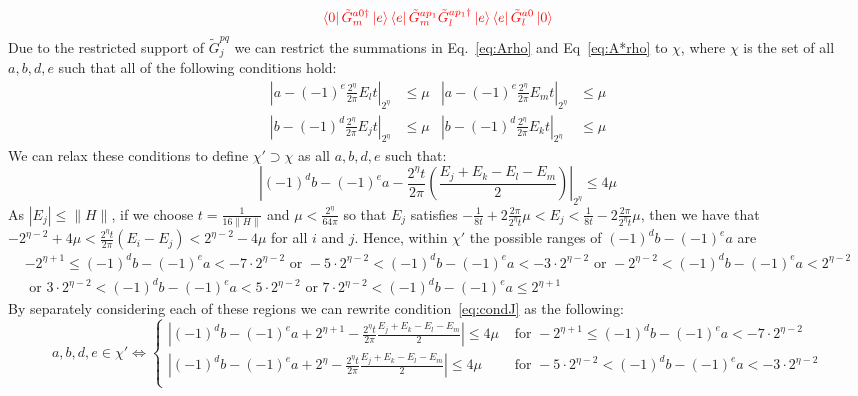 \documentclass[aps,floatfix,10pt,amssymb,amsfont,amsmath,superscriptaddress,float,nofootinbib,longbibliography,nobalancelastpage,twocolumn]{revtex4-2}
\begin{document}
\begin{widetext}
\begin{multline}
    \textcolor{red}{\bra{0}\tilde G_m^{a0\dagger}\ket{e}\bra{e}\tilde G_m^{ap_1}\tilde G_l^{ap_1\dagger}\ket{e}\bra{e}\tilde G_l^{a0}\ket{0}}
        \label{eq:A*rho}  
\end{multline}
Due to the restricted support of $\tilde G^{pq}_j$ we can restrict the summations in Eq.~\eqref{eq:Arho} and Eq~\eqref{eq:A*rho} to $\chi$, where $\chi$ is the set of all $a,b,d,e$ such that all of the following conditions hold:
\begin{equation}
\begin{aligned}
    |a-(-1)^e\frac{2^{\eta}}{2\pi}E_lt|_{2^{\eta}} &\leq \mu  &|a-(-1)^e\frac{2^{\eta}}{2\pi}E_mt|_{2^{\eta}} &\leq \mu\\
    |b-(-1)^{d}\frac{2^{\eta}}{2\pi}E_jt|_{2^{\eta}} &\leq \mu   &|b-(-1)^{d}\frac{2^{\eta}}{2\pi}E_kt|_{2^{\eta}}& \leq \mu
\end{aligned}
\end{equation}
 We can relax these conditions to define $\chi' \supset \chi$  as all $a,b, d, e$ such that:
\begin{equation}
\label{eq:condJ}
        |(-1)^db-(-1)^ea -\frac{2^{\eta}t}{2\pi}(\frac{E_j+E_k-E_l-E_m}{2})|_{2^{\eta}} \leq 4\mu
\end{equation}
As $|E_j| \leq \|H\|$, if we choose $t = \frac{1}{16\|H\|}$ and $\mu < \frac{2^{\eta}}{64\pi}$ so that $E_j$ satisfies $-\frac{1}{8t} + 2\frac{2\pi}{2^{\eta}t}\mu < E_j < \frac{1}{8t} - 2\frac{2\pi}{2^{\eta}t}\mu$, then we have that $-2^{\eta-2}+4\mu < \frac{2^{\eta}t}{2\pi}(E_i -E_j) < 2^{\eta-2}-4\mu$ for all $i$ and $j$. Hence, within $\chi'$ the possible ranges of $(-1)^db-(-1)^ea$ are
\begin{multline}
    -2^{\eta+1}\leq(-1)^db-(-1)^ea<-7\cdot2^{\eta-2} \text{ or } -5\cdot2^{\eta-2}< (-1)^db-(-1)^ea < -3\cdot2^{\eta-2} \text{ or }-2^{\eta-2}< (-1)^db-(-1)^ea < 2^{\eta-2}\\ \text{ or } 3\cdot2^{\eta-2}< (-1)^db-(-1)^ea < 5\cdot2^{\eta-2}\text{ or } 7\cdot2^{\eta-2}< (-1)^db-(-1)^ea \leq 2^{\eta+1}
\end{multline}
By separately considering each of these regions we can rewrite condition~\eqref{eq:condJ} as the following:
\begin{equation}
    a,b,d,e \in \chi' \iff \begin{cases}
    |(-1)^db-(-1)^ea+2^{\eta+1}-\frac{2^{\eta}t}{2\pi}\frac{E_j+E_k-E_l-E_m}{2}|\leq 4\mu&\text{ for }-2^{\eta+1}\leq(-1)^db-(-1)^ea<-7\cdot2^{\eta-2}\\
    |(-1)^db-(-1)^ea+2^{\eta}-\frac{2^{\eta}t}{2\pi}\frac{E_j+E_k-E_l-E_m}{2}|\leq 4\mu&\text{ for }-5\cdot 2^{\eta-2}< (-1)^db-(-1)^ea < -3\cdot2^{\eta-2}\\

\end{cases}
\end{equation}
\end{widetext}
\end{document}
